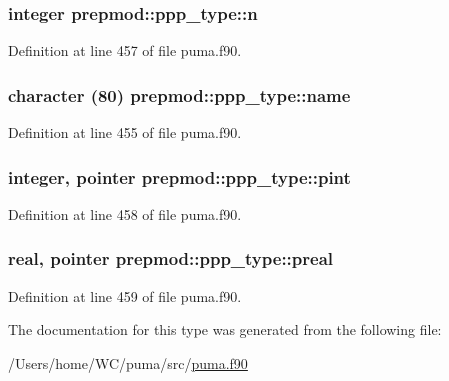 \hypertarget{structprepmod_1_1ppp__type_ad89d33651c91bc5a6594a9522916f4c7}{
\subsubsection[{n}]{\setlength{\rightskip}{0pt plus 5cm}integer {\bf prepmod\-::ppp\-\_\-type\-::n}}}
\label{structprepmod_1_1ppp__type_ad89d33651c91bc5a6594a9522916f4c7}


\-Definition at line 457 of file puma.\-f90.

\hypertarget{structprepmod_1_1ppp__type_ab9ad26f6cbb64570cc4171b5bb1ad15e}{
\subsubsection[{name}]{\setlength{\rightskip}{0pt plus 5cm}character (80) {\bf prepmod\-::ppp\-\_\-type\-::name}}}
\label{structprepmod_1_1ppp__type_ab9ad26f6cbb64570cc4171b5bb1ad15e}


\-Definition at line 455 of file puma.\-f90.

\hypertarget{structprepmod_1_1ppp__type_a4e5bc8c49dff8e4b1dff9722c55e3b43}{
\subsubsection[{pint}]{\setlength{\rightskip}{0pt plus 5cm}integer, pointer {\bf prepmod\-::ppp\-\_\-type\-::pint}}}
\label{structprepmod_1_1ppp__type_a4e5bc8c49dff8e4b1dff9722c55e3b43}


\-Definition at line 458 of file puma.\-f90.

\hypertarget{structprepmod_1_1ppp__type_a98966af6cabcf5a13a3ef4fab52de965}{
\subsubsection[{preal}]{\setlength{\rightskip}{0pt plus 5cm}real, pointer {\bf prepmod\-::ppp\-\_\-type\-::preal}}}
\label{structprepmod_1_1ppp__type_a98966af6cabcf5a13a3ef4fab52de965}


\-Definition at line 459 of file puma.\-f90.



\-The documentation for this type was generated from the following file\-:\begin{DoxyCompactItemize}
\item 
/\-Users/home/\-W\-C/puma/src/\hyperlink{puma_8f90}{puma.\-f90}\end{DoxyCompactItemize}
